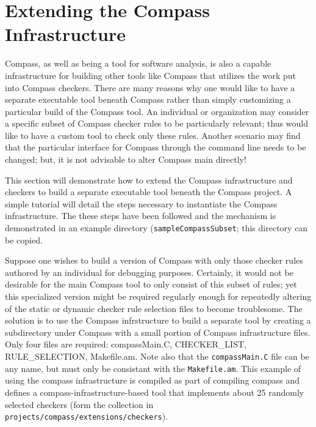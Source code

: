\section{Extending the Compass Infrastructure}

Compass, as well as being a tool for software analysis, is also a capable
infrastructure for building other tools like Compass that utilizes the work
put into Compass checkers. There are many reasons why one would like to have 
a separate executable tool beneath Compass rather than simply customizing a
particular build of the Compass tool. An individual or organization may
consider a specific subset of Compass checker rules to be particularly
relevant; thus would like to have a custom tool to check only these rules.
Another scenario may find that the particular interface for Compass through
the command line needs to be changed; but, it is not advisable to alter
Compass main directly!

This section will demonstrate how to extend the Compass
infrastructure and checkers to build a separate executable tool beneath
the Compass project. A simple tutorial will detail the steps necessary
to instantiate the Compass infrastructure. The these steps have been
followed and the mechanism is demonstrated in an example directory 
({\tt sampleCompassSubset}; this directory can be copied.

Suppose one wishes to build a version of Compass with only those checker rules
authored by an individual for debugging purposes. Certainly, it would not
be desirable for the main Compass tool to only consist of this subset of rules; yet
this specialized version might be required regularly enough for repeatedly altering
of the static or dynamic checker rule selection files to become troublesome.
The solution is to use the Compass infrstructure to build a separate tool
by creating a subdirectory under Compass with a small portion of Compass 
infrastructure files. Only four files are required: compassMain.C, CHECKER\_LIST,
RULE\_SELECTION, Makefile.am.  Note also that the {\tt compassMain.C} file
can be any name, but must only be consistant with the {\tt Makefile.am}. This
example of using the compass infrastructure is compiled as part of compiling
compass and defines a compass-infrastructure-based tool that implements
about 25 randomly selected checkers (form the collection in {\tt projects/compass/extensions/checkers}).

